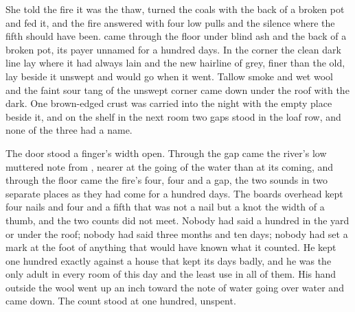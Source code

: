 She told the fire it was the thaw, turned the coals with the back of a broken pot and fed it, and the fire answered with four low pulls and the silence where the fifth should have been.  came through the floor under blind ash and the back of a broken pot, its payer unnamed for a hundred days. In the corner the clean dark line lay where it had always lain and the new hairline of grey, finer than the old, lay beside it unswept and would go when it went. Tallow smoke and wet wool and the faint sour tang of the unswept corner came down under the roof with the dark. One brown-edged crust was carried into the night with the empty place beside it, and on the shelf in the next room two gaps stood in the loaf row, and none of the three had a name.

The door stood a finger's width open. Through the gap came the river's low muttered note from , nearer at the going of the water than at its coming, and through the floor came the fire's four, four and a gap, the two sounds in two separate places as they had come for a hundred days. The boards overhead kept four nails and four and a fifth that was not a nail but a knot the width of a thumb, and the two counts did not meet. Nobody had said a hundred in the yard or under the roof; nobody had said three months and ten days; nobody had set a mark at the foot of anything that would have known what it counted. He kept one hundred exactly against a house that kept its days badly, and he was the only adult in every room of this day and the least use in all of them. His hand outside the wool went up an inch toward the note of water going over water and came down. The count stood at one hundred, unspent.
